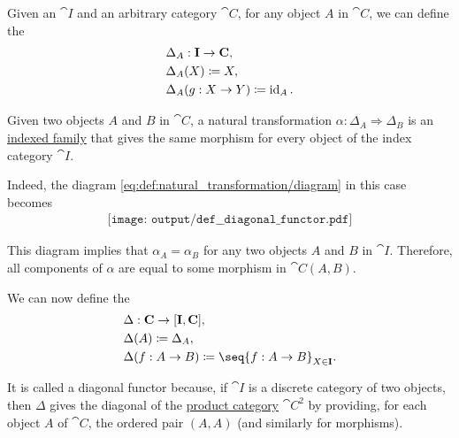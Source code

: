 \begin{definition}\label{def:diagonal_functor}
  Given an  \( \cat{I} \) and an arbitrary category \( \cat{C} \), for any object \( A \) in \( \cat{C} \), we can define the 
  \begin{equation*}
    \begin{aligned}
      &\Delta_A: \operatorname{\mathbf{I}} \to \operatorname{\mathbf{C}}, \\
      &\Delta_A(X) \coloneqq X, \\
      &\Delta_A(g: X \to Y) \coloneqq \operatorname{id}_A.
    \end{aligned}
  \end{equation*}

  Given two objects \( A \) and \( B \) in \( \cat{C} \), a natural transformation \( \alpha: \Delta_A \Rightarrow \Delta_B \) is an \hyperref[def:tuple_and_cartesian_product/indexed_family]{indexed family} that gives the same morphism for every object of the index category \( \cat{I} \).

  Indeed, the diagram \eqref{eq:def:natural_transformation/diagram} in this case becomes
  \begin{equation}\label{eq:def:diagonal_functor/nat}
    \begin{aligned}
      \texttt{[image: output/def\_\_diagonal\_functor.pdf]}
    \end{aligned}
  \end{equation}

  This diagram implies that \( \alpha_A = \alpha_B \) for any two objects \( A \) and \( B \) in \( \cat{I} \). Therefore, all components of \( \alpha \) are equal to some morphism in \( \cat{C}(A, B) \).

  We can now define the 
  \begin{equation*}
    \begin{aligned}
      &\Delta: \cat{C} \to [\cat{I}, \cat{C}], \\
      &\Delta(A) \coloneqq \Delta_A, \\
      &\Delta(f: A \to B) \coloneqq \seq{ f: A \to B }_{X \in \cat{I}}.
    \end{aligned}
  \end{equation*}

  It is called a diagonal functor because, if \( \cat{I} \) is a discrete category of two objects, then \( \Delta \) gives the diagonal of the \hyperref[def:product_category]{product category} \( \cat{C}^2 \) by providing, for each object \( A \) of \( \cat{C} \), the ordered pair \( (A, A) \) (and similarly for morphisms).
\end{definition}

